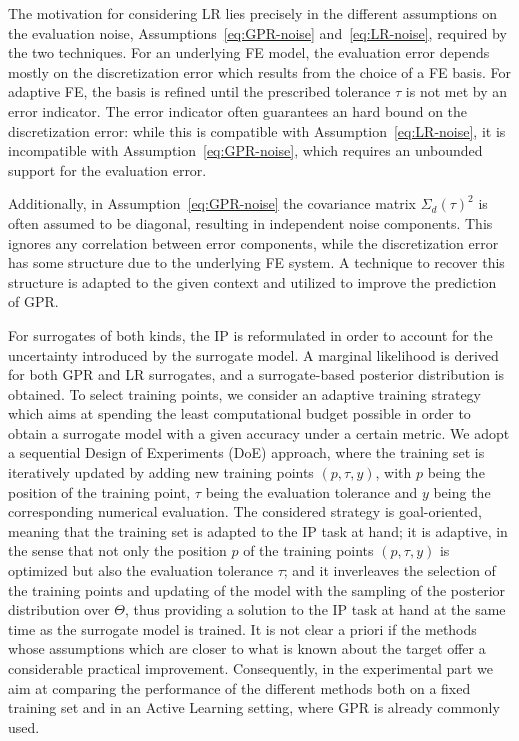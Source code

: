 The motivation for considering LR lies precisely in the different assumptions on the evaluation noise, Assumptions~\ref{eq:GPR-noise} and~\ref{eq:LR-noise}, required by the two techniques.
For an underlying FE model, the evaluation error depends mostly on the discretization error which results from the choice of a FE basis.
For adaptive FE, the basis is refined until the prescribed tolerance $\tau$ is not met by an error indicator.
The error indicator often guarantees an hard bound on the discretization error: while this is compatible with Assumption~\ref{eq:LR-noise}, it is incompatible with Assumption~\ref{eq:GPR-noise}, which requires an unbounded support for the evaluation error. 

Additionally, in Assumption~\ref{eq:GPR-noise} the covariance matrix $\Sigma_d(\tau)^2$ is often assumed to be diagonal, resulting in independent noise components. 
This ignores any correlation between error components, while the discretization error has some structure due to the underlying FE system.
A technique  to recover this structure is adapted to the given context and utilized to improve the prediction of GPR. \medskip

For surrogates of both kinds, the IP is reformulated in order to account for the uncertainty introduced by the surrogate model.
A marginal likelihood is derived for both GPR and LR surrogates, and a surrogate-based posterior distribution is obtained.
To select training points, we consider an adaptive training strategy which aims at spending the least computational budget possible in order to obtain a surrogate model with a given accuracy under a certain metric.
We adopt a sequential Design of Experiments (DoE) approach, where the training set is iteratively updated by adding new training points $(p,\tau,y)$, with $p$ being the position of the training point, $\tau$ being the evaluation tolerance and $y$ being the corresponding numerical evaluation.
The considered strategy is goal-oriented, meaning that the training set is adapted to the IP task at hand; it is adaptive, in the sense that not only the position $p$ of the training points $(p,\tau,y)$ is optimized but also the evaluation tolerance $\tau$; and it inverleaves the selection of the training points and updating of the model with the sampling of the posterior distribution over $\Theta$, thus providing a solution to the IP task at hand at the same time as the surrogate model is trained. \medskip
{}
It is not clear a priori if the methods whose assumptions which are closer to what is known about the target offer a considerable practical improvement.
Consequently, in the experimental part we aim at comparing the performance of the different methods both on a fixed training set and in an Active Learning setting, where GPR is already commonly used. 

